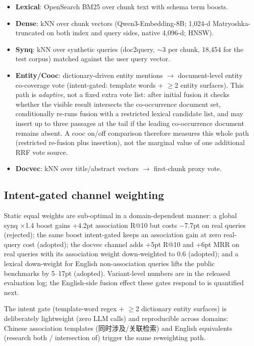 \documentclass[sigconf,nonacm]{acmart}
\begin{document}
\begin{itemize}
\item \textbf{Lexical}: OpenSearch BM25 over chunk text with schema term
boosts.
\item \textbf{Dense}: kNN over chunk vectors (Qwen3-Embedding-8B;
1{,}024-d Matryoshka-truncated on both index and query sides, native
4{,}096-d; HNSW).
\item \textbf{Synq}: kNN over synthetic queries (doc2query, ${\sim}3$ per
chunk, 18{,}454 for the test corpus) matched against the user query vector.
\item \textbf{Entity/Cooc}: dictionary-driven entity mentions $\to$
document-level entity co-coverage vote (intent-gated: template words +
$\geq$2 entity surfaces). This path is \emph{adaptive}, not a fixed
extra vote list: after initial fusion it checks whether the visible
result intersects the co-occurrence document set, conditionally re-runs
fusion with a restricted lexical candidate list, and may insert up to
three passages at the tail if the leading co-occurrence document
remains absent. A cooc on/off comparison therefore measures this whole
path (restricted re-fusion plus insertion), not the marginal value of
one additional RRF vote source.
\item \textbf{Docvec}: kNN over title/abstract vectors $\to$
first-chunk proxy vote.
\end{itemize}

\subsection{Intent-gated channel weighting}

Static equal weights are sub-optimal in a domain-dependent manner: a
global synq $\times$1.4 boost gains +4.2pt association R@10 but costs
$-$7.7pt on real queries (rejected); the same boost intent-gated keeps an
association gain at zero real-query cost (adopted); the docvec channel
adds +5pt R@10 and +6pt MRR on real queries with its association weight
down-weighted to 0.6 (adopted); and a lexical down-weight for English
non-association queries lifts the public benchmarks by 5--17pt (adopted).
Variant-level numbers are in the released evaluation log; the English-side
fusion effect these gates respond to is quantified next.

The intent gate (template-word regex + $\geq$2 dictionary entity surfaces) is
deliberately lightweight (zero LLM calls) and reproducible across domains:
Chinese association templates (同时涉及/关联检索) and English equivalents
(research both / intersection of) trigger the same reweighting path.
\end{document}
